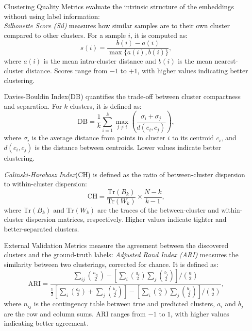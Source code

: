 \documentclass[a4paper,12pt,reqno]{amsart}
\theoremstyle{definition}
\theoremstyle{remark}
\begin{document}
{Clustering Quality Metrics} evaluate the intrinsic structure of the embeddings without using label information:\\
\textit{Silhouette Score (Sil)} measures how similar samples are to their own cluster compared to other clusters. For a sample $i$, it is computed as:
	\begin{equation}
		s(i) = \frac{b(i) - a(i)}{\max\{a(i), b(i)\}},
	\end{equation}
	where $a(i)$ is the mean intra-cluster distance and $b(i)$ is the mean nearest-cluster distance. Scores range from $-1$ to $+1$, with higher values indicating better clustering.
	
{Davies-Bouldin Index}(DB) quantifies the trade-off between cluster compactness and separation. For $k$ clusters, it is defined as:
	\begin{equation}
		\text{DB} = \frac{1}{k} \sum_{i=1}^k \max_{j \neq i} \left( \frac{\sigma_i + \sigma_j}{d(c_i, c_j)} \right),
	\end{equation}
	where $\sigma_i$ is the average distance from points in cluster $i$ to its centroid $c_i$, and $d(c_i, c_j)$ is the distance between centroids. Lower values indicate better clustering.
	
 \textit{Calinski-Harabasz Index}(CH) is defined as the ratio of between-cluster dispersion to within-cluster dispersion:
	\begin{equation}
		\text{CH} = \frac{\text{Tr}(B_k)}{\text{Tr}(W_k)} \times \frac{N - k}{k - 1},
	\end{equation}
	where $\text{Tr}(B_k)$ and $\text{Tr}(W_k)$ are the traces of the between-cluster and within-cluster dispersion matrices, respectively. Higher values indicate tighter and better-separated clusters.


{External Validation Metrics} measure the agreement between the discovered clusters and the ground-truth labels:
\textit{Adjusted Rand Index (ARI)} measures the similarity between two clusterings, corrected for chance. It is defined as:
	\begin{equation}
		\text{ARI} = \frac{\sum_{ij} \binom{n_{ij}}{2} - \left[\sum_i \binom{a_i}{2} \sum_j \binom{b_j}{2}\right] / \binom{n}{2}}{\frac{1}{2} \left[\sum_i \binom{a_i}{2} + \sum_j \binom{b_j}{2}\right] - \left[\sum_i \binom{a_i}{2} \sum_j \binom{b_j}{2}\right] / \binom{n}{2}},
	\end{equation}
	where $n_{ij}$ is the contingency table between true and predicted clusters, $a_i$ and $b_j$ are the row and column sums. ARI ranges from $-1$ to $1$, with higher values indicating better agreement.
	
\end{document}
